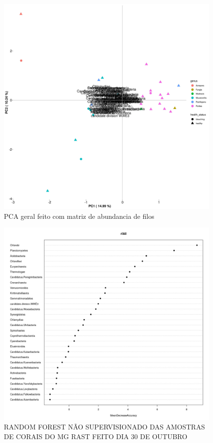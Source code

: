 \documentclass[12pt, a4paper]{report}
\begin{document}
\begin{figure}[H]
\centering
\includegraphics[scale=0.4]{figures/filos/output_PCA_corais_filos_mg_rast_2018_10_30.jpg}
\caption{PCA geral feito com matriz de abundancia de filos}
\label{fig:PCAfeito30deoutubro}
\end{figure}

\begin{figure}[H]
\centering
\includegraphics[scale=0.4]{figures/filos/randomforest_nao_supervisionado_corais_mgrast_filos_leticia_2018_10_30.jpeg}
\caption{RANDOM FOREST NÃO SUPERVISIONADO DAS AMOSTRAS DE CORAIS DO MG RAST FEITO DIA 30 DE OUTUBRO}
\label{fig:Rfnaosupervisionadofeito30deoutubro}
\end{figure}
\end{document}
